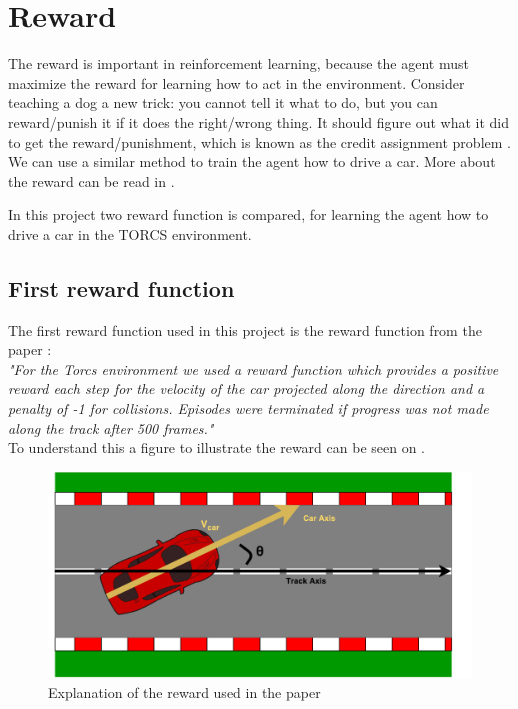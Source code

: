 \section{Reward}\label{sectionReward}
The reward is important in reinforcement learning, because the agent must maximize the reward for learning how to act in the environment. Consider teaching a dog a new trick: you cannot tell it what to do, but you can reward/punish it if it does the right/wrong thing. It should figure out what it did to get the reward/punishment, which is known as the credit assignment problem \cite{reward_small}. We can use a similar method to train the agent how to drive a car. More about the reward can be read in .  
	
In this project two reward function is compared, for learning the agent how to drive a car in the TORCS environment.  

\subsection*{First reward function}
The first reward function used in this project is the reward function from the paper \cite{DBLP:journals/corr/LillicrapHPHETS15}: \\
\textit{"For the Torcs environment we used a reward function which provides a positive reward each step for the velocity of the car projected along the direction and a penalty of -1 for collisions. Episodes were terminated if progress was not made along the track after 500 frames."}\\
To understand this a figure to illustrate the reward can be seen on .

\begin{figure}[H]
	\centering
	\includegraphics[width=1\textwidth]{Figures/Result/Reward_paper.pdf}
	\caption{Explanation of the reward used in the paper \cite{DBLP:journals/corr/LillicrapHPHETS15} }
	\label{fig:Reward_paper}
\end{figure}

